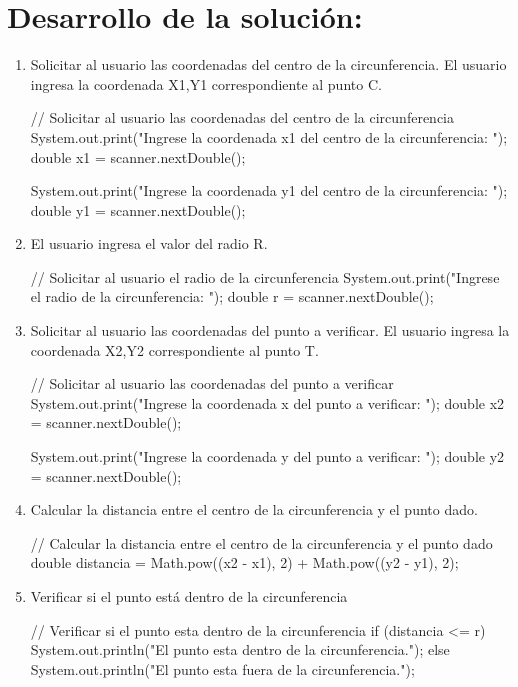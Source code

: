 \documentclass{IEEEcsmag}
\begin{document}
\section*{Desarrollo de la solución:}
\setlength{\parskip}{5pt}
\begin{enumerate} 

\item Solicitar al usuario las coordenadas del centro de la circunferencia. El usuario ingresa la coordenada X1,Y1 correspondiente al punto C.\newline
\begin{javaCode}
// Solicitar al usuario las coordenadas del centro de la circunferencia
System.out.print("Ingrese la coordenada x1 del centro de la circunferencia: ");
double x1 = scanner.nextDouble();

System.out.print("Ingrese la coordenada y1 del centro de la circunferencia: ");
double y1 = scanner.nextDouble();
\end{javaCode}


\item El usuario ingresa el valor del radio R.
\begin{javaCode}
// Solicitar al usuario el radio de la circunferencia
System.out.print("Ingrese el radio de la circunferencia: ");
double r = scanner.nextDouble();
\end{javaCode}




\item Solicitar al usuario las coordenadas del punto a verificar. El usuario ingresa la coordenada X2,Y2 correspondiente al punto T.
\begin{javaCode}
// Solicitar al usuario las coordenadas del punto a verificar
System.out.print("Ingrese la coordenada x del punto a verificar: ");
double x2 = scanner.nextDouble();

System.out.print("Ingrese la coordenada y del punto a verificar: ");
double y2 = scanner.nextDouble();
\end{javaCode}



\item Calcular la distancia entre el centro de la circunferencia y el punto dado.
\begin{javaCode}
// Calcular la distancia entre el centro de la circunferencia y el punto dado
double distancia = Math.pow((x2 - x1), 2) + Math.pow((y2 - y1), 2);
\end{javaCode}



\item Verificar si el punto está dentro de la circunferencia
\begin{javaCode}
// Verificar si el punto esta dentro de la circunferencia
if (distancia <= r) {
    System.out.println("El punto esta dentro de la circunferencia.");
} else {
    System.out.println("El punto esta fuera de la circunferencia.");
}
\end{javaCode}

\end{enumerate}
\end{document}
